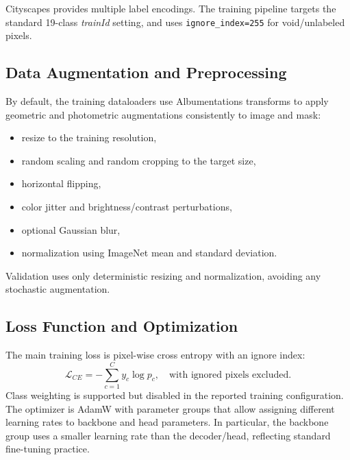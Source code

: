 \documentclass[conference]{IEEEtran}
\begin{document}
Cityscapes provides multiple label encodings. The training pipeline targets the standard 19-class \textit{trainId} setting, and uses \texttt{ignore\_index=255} for void/unlabeled pixels.

\subsection{Data Augmentation and Preprocessing}
By default, the training dataloaders use Albumentations transforms to apply geometric and photometric augmentations consistently to image and mask:
\begin{itemize}
\item resize to the training resolution,
\item random scaling and random cropping to the target size,
\item horizontal flipping,
\item color jitter and brightness/contrast perturbations,
\item optional Gaussian blur,
\item normalization using ImageNet mean and standard deviation.
\end{itemize}
Validation uses only deterministic resizing and normalization, avoiding any stochastic augmentation.

\subsection{Loss Function and Optimization}
The main training loss is pixel-wise cross entropy with an ignore index:
\begin{equation}
\mathcal{L}_{CE} = - \sum_{c=1}^{C} y_c \log p_c, \quad \text{with ignored pixels excluded.}
\end{equation}
Class weighting is supported but disabled in the reported training configuration. The optimizer is AdamW with parameter groups that allow assigning different learning rates to backbone and head parameters. In particular, the backbone group uses a smaller learning rate than the decoder/head, reflecting standard fine-tuning practice.
\end{document}
